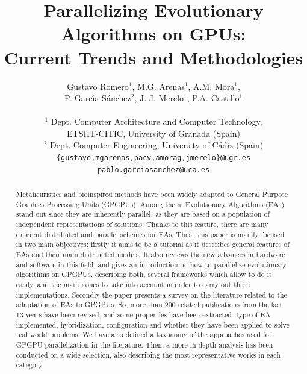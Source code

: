 \documentclass{article}
\begin{document}


\title{Parallelizing Evolutionary Algorithms on GPUs:\\ Current Trends and Methodologies}


\author{Gustavo Romero$^1$, M.G. Arenas$^1$, A.M. Mora$^1$, \\ 
P. Garc{\'\i}a-S{\'a}nchez$^2$, J. J. Merelo$^1$, P.A. Castillo$^1$  \\ \\
\small{$^1$ Dept. Computer Architecture and Computer Technology,}\\
\small{ETSIIT-CITIC, University of Granada (Spain)}\\
\small{$^2$ Dept. Computer Engineering, University of C{\'a}diz (Spain)}\\
\small{\texttt{\{gustavo,mgarenas,pacv,amorag,jmerelo\}@ugr.es}}\\ \small{\texttt{pablo.garciasanchez@uca.es}}
} 

\maketitle


\begin{abstract}
Metaheuristics and bioinspired methods have been widely adapted to
General Purpose Graphics Processing Units (GPGPUs). Among them, 
Evolutionary Algorithms (EAs) stand out since they are inherently
parallel, as they are based on a population of independent representations of
solutions. Thanks to this feature, there are many different distributed and parallel schemes for EAs. 
Thus, this paper is mainly focused in two main objectives: firstly it aims to be a tutorial as it describes general features of EAs and their main distributed models. It also reviews the new advances in hardware and software in this field, and gives an introduction on how to parallelize evolutionary algorithms on GPGPUs, describing both, several frameworks which allow to do it easily, and the main issues to take into account in order to carry out these implementations.
Secondly the paper presents a survey on the literature related to the adaptation of EAs to GPGPUs.  
So, more than 200 related publications from the last 13 years have been revised, and some properties have been extracted: type of EA implemented, hybridization, configuration and whether they have been applied to solve real world problems.  
We have also defined a taxonomy of the approaches used for GPGPU parallelization
in the literature. Then, a more in-depth analysis has been conducted
on a wide selection, also describing the most representative works in each
category. 
\end{abstract}
\end{document}
